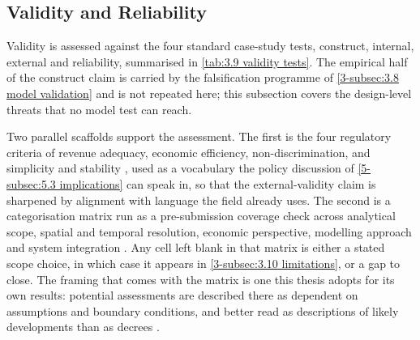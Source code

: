 \subsection{Validity and Reliability}
\label{3-subsec:3.9 validity}

Validity is assessed against the four standard case-study tests, construct, internal, external and reliability, summarised in \autoref{tab:3.9 validity tests}. The empirical half of the construct claim is carried by the falsification programme of \autoref{3-subsec:3.8 model validation} and is not repeated here; this subsection covers the design-level threats that no model test can reach.

Two parallel scaffolds support the assessment. The first is the four regulatory criteria of revenue adequacy, economic efficiency, non-discrimination, and simplicity and stability \cite{bergaentzle_electricity_2019}, used as a vocabulary the policy discussion of \autoref{5-subsec:5.3 implications} can speak in, so that the external-validity claim is sharpened by alignment with language the field already uses. The second is a categorisation matrix run as a pre-submission coverage check across analytical scope, spatial and temporal resolution, economic perspective, modelling approach and system integration \cite{atabaki_systematic_2025}. Any cell left blank in that matrix is either a stated scope choice, in which case it appears in \autoref{3-subsec:3.10 limitations}, or a gap to close. The framing that comes with the matrix is one this thesis adopts for its own results: potential assessments are described there as dependent on assumptions and boundary conditions, and better read as descriptions of likely developments than as decrees \cite{atabaki_systematic_2025}.

